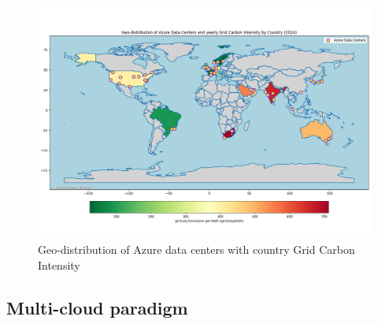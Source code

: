 \begin{figure}[htb]
    \centering
    \includegraphics[width=1\linewidth]{images/azure_data_centers.png}
    \caption{Geo-distribution of Azure data centers with country Grid Carbon Intensity}
    \label{fig:azure_data_centers}
\end{figure}



\subsection{Multi-cloud paradigm}

